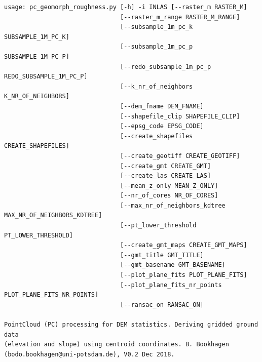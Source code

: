 \documentclass[a4paperpaper,,tablecaptionabove]{scrartcl}
\begin{document}
\begin{lstlisting}
usage: pc_geomorph_roughness.py [-h] -i INLAS [--raster_m RASTER_M]
                                [--raster_m_range RASTER_M_RANGE]
                                [--subsample_1m_pc_k SUBSAMPLE_1M_PC_K]
                                [--subsample_1m_pc_p SUBSAMPLE_1M_PC_P]
                                [--redo_subsample_1m_pc_p REDO_SUBSAMPLE_1M_PC_P]
                                [--k_nr_of_neighbors K_NR_OF_NEIGHBORS]
                                [--dem_fname DEM_FNAME]
                                [--shapefile_clip SHAPEFILE_CLIP]
                                [--epsg_code EPSG_CODE]
                                [--create_shapefiles CREATE_SHAPEFILES]
                                [--create_geotiff CREATE_GEOTIFF]
                                [--create_gmt CREATE_GMT]
                                [--create_las CREATE_LAS]
                                [--mean_z_only MEAN_Z_ONLY]
                                [--nr_of_cores NR_OF_CORES]
                                [--max_nr_of_neighbors_kdtree MAX_NR_OF_NEIGHBORS_KDTREE]
                                [--pt_lower_threshold PT_LOWER_THRESHOLD]
                                [--create_gmt_maps CREATE_GMT_MAPS]
                                [--gmt_title GMT_TITLE]
                                [--gmt_basename GMT_BASENAME]
                                [--plot_plane_fits PLOT_PLANE_FITS]
                                [--plot_plane_fits_nr_points PLOT_PLANE_FITS_NR_POINTS]
                                [--ransac_on RANSAC_ON]

PointCloud (PC) processing for DEM statistics. Deriving gridded ground data
(elevation and slope) using centroid coordinates. B. Bookhagen
(bodo.bookhagen@uni-potsdam.de), V0.2 Dec 2018.


\end{lstlisting}
\end{document}
